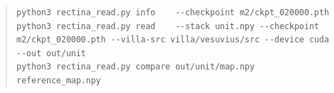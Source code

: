 \begin{quote}
\begin{Verbatim}[fontsize=\scriptsize,breaklines=true,breakanywhere=true,breakautoindent=false]
python3 rectina_read.py info    --checkpoint m2/ckpt_020000.pth
python3 rectina_read.py read    --stack unit.npy --checkpoint m2/ckpt_020000.pth --villa-src villa/vesuvius/src --device cuda --out out/unit
python3 rectina_read.py compare out/unit/map.npy reference_map.npy
\end{Verbatim}
\end{quote}

